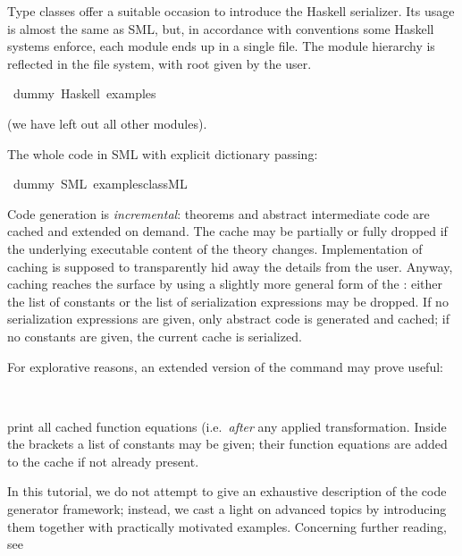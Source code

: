 \begin{isabellebody}
\begin{isamarkuptext}
Type classes offer a suitable occasion to introduce
  the Haskell serializer.  Its usage is almost the same
  as SML, but, in accordance with conventions
  some Haskell systems enforce, each module ends
  up in a single file. The module hierarchy is reflected in
  the file system, with root given by the user.%
\end{isamarkuptext}%
\isamarkuptrue%
\isamarkupfalse%
\ dummy\ {\isacharparenleft}Haskell\ {\isachardoublequoteopen}examples{\isacharslash}{\isachardoublequoteclose}{\isacharparenright}%
\begin{isamarkuptext}%

  (we have left out all other modules).

  The whole code in SML with explicit dictionary passing:%
\end{isamarkuptext}%
\isamarkuptrue%
\isamarkupfalse%
\ dummy\ {\isacharparenleft}SML\ {\isachardoublequoteopen}examples{\isacharslash}class{\isachardot}ML{\isachardoublequoteclose}{\isacharparenright}%
\begin{isamarkuptext}%
%
\end{isamarkuptext}%
\isamarkuptrue%
%
\isamarkuptrue%
%
\begin{isamarkuptext}%
Code generation is \emph{incremental}: theorems
  and abstract intermediate code are cached and extended on demand.
  The cache may be partially or fully dropped if the underlying
  executable content of the theory changes.
  Implementation of caching is supposed to transparently
  hid away the details from the user.  Anyway, caching
  reaches the surface by using a slightly more general form
  of the \isasymCODEGEN: either the list of constants or the
  list of serialization expressions may be dropped.  If no
  serialization expressions are given, only abstract code
  is generated and cached; if no constants are given, the
  current cache is serialized.

  For explorative reasons, an extended version of the
  \isasymCODEGEN command may prove useful:%
\end{isamarkuptext}%
\isamarkuptrue%
\isamarkupfalse%
\ {\isacharparenleft}{\isacharparenright}%
\begin{isamarkuptext}%
\noindent print all cached function equations (i.e.~\emph{after}
  any applied transformation. Inside the brackets a
  list of constants may be given; their function
  equations are added to the cache if not already present.%
\end{isamarkuptext}%
\isamarkuptrue%
%
\isamarkuptrue%
%
\begin{isamarkuptext}%
In this tutorial, we do not attempt to give an exhaustive
  description of the code generator framework; instead,
  we cast a light on advanced topics by introducing
  them together with practically motivated examples.  Concerning
  further reading, see


\end{isamarkuptext}
\end{isabellebody}
